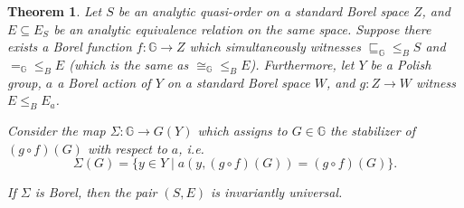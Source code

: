 \documentclass{amsart}
\newtheorem{theorem}{Theorem}[section]
\theoremstyle{definition}
\theoremstyle{remark}
\begin{document}
\begin{theorem}\label{theorsaturation}
Let $S$ be an analytic quasi-order on a standard Borel space $Z$, and
$E \subseteq E_S$  be an analytic equivalence relation on the same
space. Suppose there exists a Borel function $f \colon {\mathbb{G}} \to Z$ which
simultaneously witnesses ${\sqsubseteq_{\mathbb{G}}} \leq_B S$ and ${=_{\mathbb{G}}} \leq_B
E$ (which is the same as ${\cong_{\mathbb{G}}} \leq_B E$). Furthermore, let $Y$ be a
Polish group, $a$ a Borel action of $Y$ on a standard Borel space $W$,
and $g \colon Z \to W$ witness $E \leq_B E_a$.

Consider the map $\Sigma \colon {\mathbb{G}} \to G(Y)$ which assigns to $G \in {\mathbb{G}}$ the
stabilizer of $(g \circ f)(G)$ with respect to $a$, i.e.\
\[
\Sigma(G) = \{y \in Y \mid a(y, (g \circ f)(G)) = (g \circ f)(G)\}.
\]

If $\Sigma$ is Borel, then the pair $(S,E)$ is invariantly universal.
\end{theorem}
\end{document}
